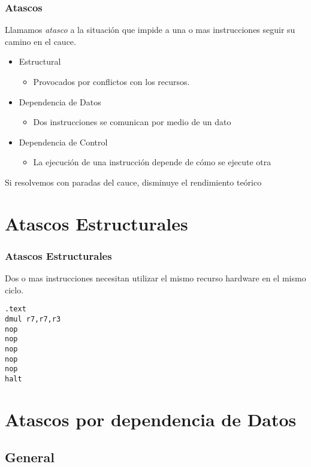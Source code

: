 \documentclass{beamer}
\begin{document}
\begin{frame}
\frametitle{Atascos}
Llamamos \emph{atasco} a la situación que impide a una o mas instrucciones seguir su camino en el cauce.

\begin{itemize}
\item Estructural
\begin{itemize}
\item Provocados por conflictos con los recursos.
\end{itemize}

\item Dependencia de Datos
\begin{itemize}
\item Dos instrucciones se comunican por medio de un dato
\end{itemize}

\item Dependencia de Control
\begin{itemize}
\item La ejecución de una instrucción depende de cómo se ejecute otra
\end{itemize}

\end{itemize}
Si resolvemos con paradas del cauce, disminuye el rendimiento teórico
\end{frame}


\section{Atascos Estructurales}

\begin{frame}[fragile]
\frametitle{Atascos Estructurales}
Dos o mas instrucciones necesitan utilizar el mismo recurso hardware en el mismo ciclo.

\begin{block}{}
\begin{lstlisting}[language=WinMIPS64,basicstyle=\ttfamily,keywordstyle=\color{blue}]
.text
dmul r7,r7,r3
nop 
nop 
nop 
nop 
nop 
halt
\end{lstlisting}
\end{block}
\end{frame}

\section{Atascos por dependencia de Datos}
\subsection{General}
\end{document}
